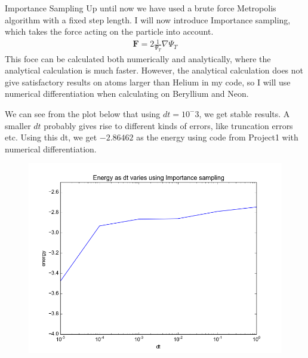 \documentclass[a4paper, 12pt, titlepage]{article}
\begin{document}
\begin{section}{Importance Sampling}
 Up until now we have used a brute force Metropolis algorithm with a fixed step length. I will now introduce Importance sampling, which takes the force acting on the particle into account.
 \begin{align*}
 	\mathbf{F} = 2 \frac{1}{\Psi_T} \nabla \Psi_T	
 \end{align*}
 This foce can be calculated both numerically and analytically, where the analytical calculation is much faster. However, the analytical calculation does not give satisfactory results on atoms larger than Helium in my code, so I will use numerical differentiation when calculating on Beryllium and Neon. 

 We can see from the plot below that using $dt = 10^-3$, we get stable results. A smaller $dt$ probably gives rise to different kinds of errors, like truncation errors etc. Using this dt, we get $-2.86462$ as the energy using code from Project1 with numerical differentiation. 
 \begin{figure}[H] 
 	\centering
 	\includegraphics[width=\textwidth]{../python_programs/ImportanceSampling_Helium_dt.png}
 \end{figure}

\end{section}
\end{document}
